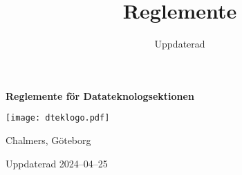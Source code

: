 \documentclass{dtek}
\title{Reglemente}
\date{Uppdaterad \updated}
\newcommand{\updated}{2024--04--25}
\begin{document}
\makeheadfoot%

\begin{center}
  {\Huge \textbf{Reglemente för Datateknologsektionen}}

  \texttt{[image: dteklogo.pdf]}

  {\LARGE Chalmers, Göteborg}

  \vspace{2cm}

  {\LARGE Uppdaterad \updated}
\end{center}

\newpage

\setcounter{tocdepth}{2}
\tableofcontents

\newpage

\end{document}
